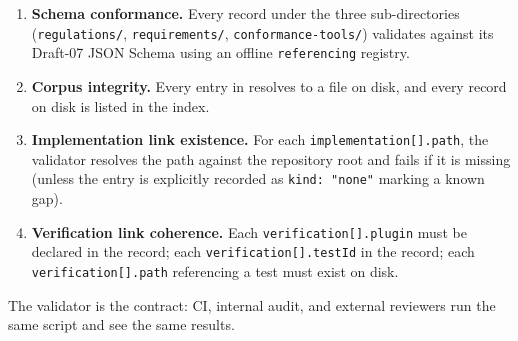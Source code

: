 \begin{enumerate}
  \item \textbf{Schema conformance.} Every record under the three
         sub-directories
        (\texttt{regulations/}, \texttt{requirements/},
        \texttt{conformance-tools/}) validates against its Draft-07 JSON
        Schema using an offline \texttt{referencing} registry.
  \item \textbf{Corpus integrity.} Every entry in
         resolves to a file on disk, and
        every record on disk is listed in the index.
  \item \textbf{Implementation link existence.} For each
        \texttt{implementation[].path}, the validator resolves the path
        against the repository root and fails if it is missing (unless the
        entry is explicitly recorded as \texttt{kind: "none"} marking a
        known gap).
  \item \textbf{Verification link coherence.} Each
        \texttt{verification[].plugin} must be declared in the
         record; each \texttt{verification[].testId} in the
         record; each \texttt{verification[].path}
        referencing a test must exist on disk.
\end{enumerate}

The validator is the contract: CI, internal audit, and external reviewers
run the same script and see the same results.
\clearpage

